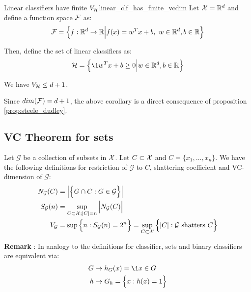 \begin{corollary}{Linear classifiers have finite $V_{\mathcal{H}}$}{linear_clf_has_finite_vcdim}
    Let $\mathcal{X}=\mathbb{R}^d$ and define a function space $\mathcal{F}$ as:
    \begin{align*}
        \mathcal{F} = \Big\{ 
            f:\mathbb{R}^d\to\mathbb{R} \Big| f(x) = w^Tx + b, \ w\in\mathbb{R}^d, b\in\mathbb{R}
         \Big\}
    \end{align*}

    \noindent Then, define the set of linear classifiers as:
    \begin{align*}
        \Hf = \bigCurl{
            \1{w^Tx+b\ge 0} \Big| w\in \R^d, b\in\R
        }
    \end{align*}

    \noindent We have $V_{\mathcal{H}}\le d+1$.
\end{corollary}

\begin{proof*}
    Since $dim(\mathcal{F})=d+1$, the above corollary is a direct consequence of proposition \ref{prop:steele_dudley}.
\end{proof*}


\subsection{VC Theorem for sets}
\begin{definition}
    Let $\mathcal{G}$ be a collection of subsets in $\mathcal{X}$. Let $C\subset\mathcal{X}$ and $C=\{x_1, \dots, x_n\}$. We have the following definitions for restriction of $\mathcal{G}$ to $C$, shattering coefficient and VC-dimension of $\mathcal{G}$:
    \begin{align*}
        N_\mathcal{G}(C) &= \Big|  \Big\{  G \cap C : G \in \mathcal{G}  \Big\}  \Big| \\
        S_\mathcal{G}(n) &= \sup_{C\subset\mathcal{X}; |C|=n} \Big|  N_\mathcal{G}(C)  \Big| \\
        V_\mathcal{G}    &= \sup\Big\{  n : S_\mathcal{G}(n) = 2^n  \Big\} = \sup_{C\subset\mathcal{X}}\Big\{  |C| : \mathcal{G} \text{ shatters } C  \Big\}
    \end{align*}
\end{definition}

\textbf{Remark} : In analogy to the definitions for classifier, sets and binary classifiers are equivalent via:
\begin{align*}
    G &\to h_G(x) = \1{x \in G} \\
    h &\to G_h = \bigCurl{ x : h(x)=1 }
\end{align*}

